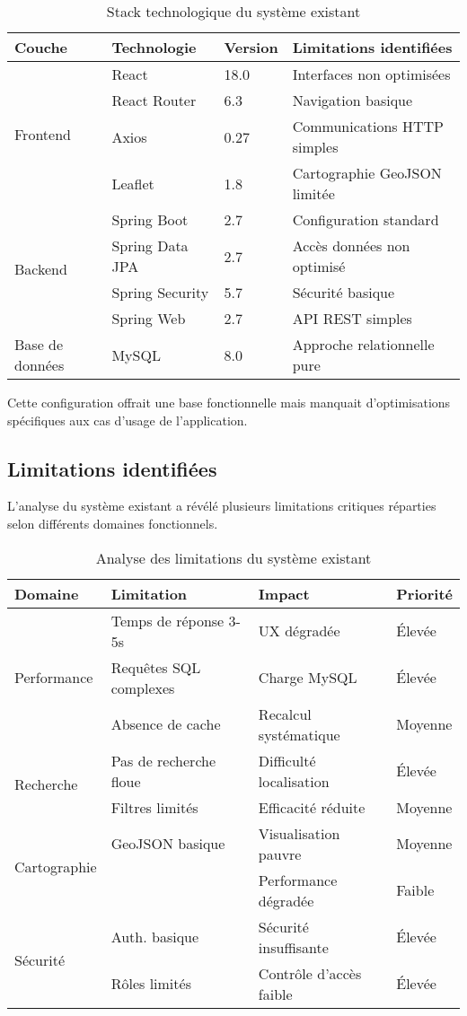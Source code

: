 \begin{table}[H]
\centering
\caption{Stack technologique du système existant}
\label{tab:stack_existant}
\begin{tabular}{|l|l|l|p{4cm}|}
\hline
\textbf{Couche} & \textbf{Technologie} & \textbf{Version} & \textbf{Limitations identifiées} \\
\hline
\multirow{4}{*}{Frontend} & React & 18.0 & Interfaces non optimisées \\
& React Router & 6.3 & Navigation basique \\
& Axios & 0.27 & Communications HTTP simples \\
& Leaflet & 1.8 & Cartographie GeoJSON limitée \\
\hline
\multirow{4}{*}{Backend} & Spring Boot & 2.7 & Configuration standard \\
& Spring Data JPA & 2.7 & Accès données non optimisé \\
& Spring Security & 5.7 & Sécurité basique \\
& Spring Web & 2.7 & API REST simples \\
\hline
Base de données & MySQL & 8.0 & Approche relationnelle pure \\
\hline
\end{tabular}
\end{table}

Cette configuration offrait une base fonctionnelle mais manquait d'optimisations spécifiques aux cas d'usage de l'application.
\subsection{Limitations identifiées}

L'analyse du système existant a révélé plusieurs limitations critiques réparties selon différents domaines fonctionnels.

\begin{table}[H]
\centering
\caption{Analyse des limitations du système existant}
\label{tab:limitations}
\begin{tabular}{|l|p{4cm}|l|p{3cm}|}
\hline
\textbf{Domaine} & \textbf{Limitation} & \textbf{Impact} & \textbf{Priorité} \\
\hline
\multirow{3}{*}{Performance} & Temps de réponse 3-5s & UX dégradée & Élevée \\
& Requêtes SQL complexes & Charge MySQL & Élevée \\
& Absence de cache & Recalcul systématique & Moyenne \\
\hline
\multirow{2}{*}{Recherche} & Pas de recherche floue & Difficulté localisation & Élevée \\
& Filtres limités & Efficacité réduite & Moyenne \\
\hline
\multirow{2}{*}{Cartographie} & GeoJSON basique & Visualisation pauvre & Moyenne \\
& & Performance dégradée & Faible \\
\hline
\multirow{2}{*}{Sécurité} & Auth. basique & Sécurité insuffisante & Élevée \\
& Rôles limités & Contrôle d'accès faible & Élevée \\
\hline
\end{tabular}
\end{table}

